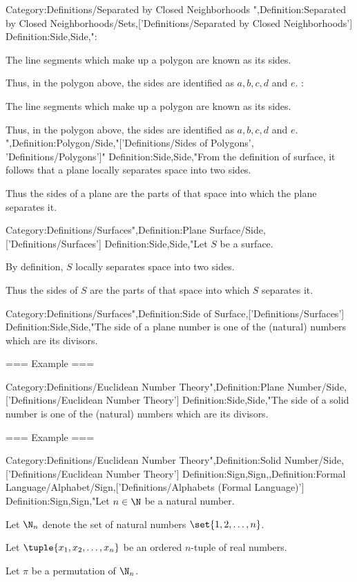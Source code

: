 Category:Definitions/Separated by Closed Neighborhoods
",Definition:Separated by Closed Neighborhoods/Sets,['Definitions/Separated by Closed Neighborhoods']
Definition:Side,Side,":

The line segments which make up a polygon are known as its sides.

Thus, in the polygon above, the sides are identified as $a, b, c, d$ and $e$.
:

The line segments which make up a polygon are known as its sides.

Thus, in the polygon above, the sides are identified as $a, b, c, d$ and $e$.
",Definition:Polygon/Side,"['Definitions/Sides of Polygons', 'Definitions/Polygons']"
Definition:Side,Side,"From the definition of surface, it follows that a plane locally separates space into two sides.

Thus the sides of a plane are the parts of that space into which the plane separates it.


Category:Definitions/Surfaces",Definition:Plane Surface/Side,['Definitions/Surfaces']
Definition:Side,Side,"Let $S$ be a surface.

By definition, $S$ locally separates space into two sides.

Thus the sides of $S$ are the parts of that space into which $S$ separates it.


Category:Definitions/Surfaces",Definition:Side of Surface,['Definitions/Surfaces']
Definition:Side,Side,"The side of a plane number is one of the (natural) numbers which are its divisors.


=== Example ===


Category:Definitions/Euclidean Number Theory",Definition:Plane Number/Side,['Definitions/Euclidean Number Theory']
Definition:Side,Side,"The side of a solid number is one of the (natural) numbers which are its divisors.


=== Example ===


Category:Definitions/Euclidean Number Theory",Definition:Solid Number/Side,['Definitions/Euclidean Number Theory']
Definition:Sign,Sign,,Definition:Formal Language/Alphabet/Sign,['Definitions/Alphabets (Formal Language)']
Definition:Sign,Sign,"Let $n \in \N$ be a natural number.

Let $\N_n$ denote the set of natural numbers $\set {1, 2, \ldots, n}$.

Let $\tuple {x_1, x_2, \ldots, x_n}$ be an ordered $n$-tuple of real numbers.

Let $\pi$ be a permutation of $\N_n$.


